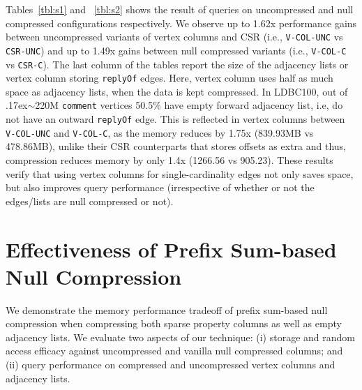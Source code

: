 Tables~\ref{tbl:s1} and ~\ref{tbl:s2} shows the result of queries on uncompressed and null compressed configurations respectively. We observe up to 1.62x performance gains between uncompressed variants of vertex columns and CSR (i.e., \texttt{V-COL-UNC} vs \texttt{CSR-UNC}) and up to 1.49x gains between null compressed variants (i.e.,  \texttt{V-COL-C} vs \texttt{CSR-C}). The last column of the tables report the size of the adjacency lists or vertex column storing \texttt{replyOf} edges. Here, vertex column uses half as much space as adjacency lists, when the data is kept compressed. In LDBC100, out of {\raise.17ex\hbox{$\scriptstyle\sim$}}220M \texttt{comment} vertices 50.5\% have empty forward adjacency list, i.e, do not have an outward \texttt{replyOf} edge. This is reflected in vertex columns between \texttt{V-COL-UNC} and \texttt{V-COL-C}, as the memory reduces by 1.75x (839.93MB vs 478.86MB), unlike their CSR counterparts that stores offsets as extra and thus, compression reduces memory by only 1.4x (1266.56 vs 905.23). These results verify that using vertex columns for single-cardinality edges not only saves space, but also improves query performance (irrespective of whether or not the edges/lists are null compressed or not).

\section{Effectiveness of Prefix Sum-based Null Compression}
\label{exp:prefixSum}

We demonstrate the memory performance tradeoff of prefix sum-based null compression when compressing both sparse property columns as well as empty adjacency lists. We evaluate two aspects of our technique: (i) storage and random access efficacy against uncompressed and vanilla null compressed columns; and (ii) query performance on compressed and uncompressed vertex columns and adjacency lists.


